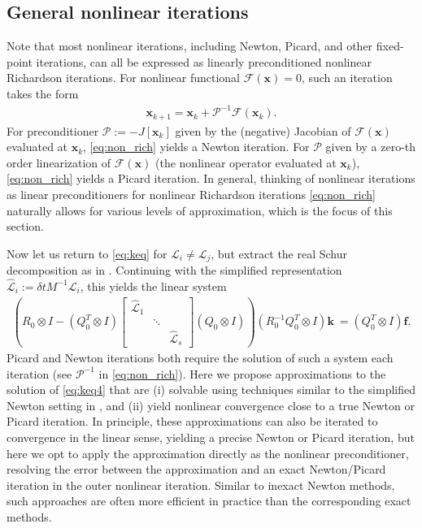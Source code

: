 \documentclass[review]{siamart}
\begin{document}
\subsection{General nonlinear iterations}\label{sec:nonlinear:gen}

Note that most nonlinear iterations, including Newton, Picard, and
other fixed-point iterations, can all be expressed as linearly preconditioned
nonlinear Richardson iterations. For nonlinear functional
$\mathcal{F}(\mathbf{x}) = 0$, such an iteration takes the form
%
\begin{align}\label{eq:non_rich}
\mathbf{x}_{k+1} = \mathbf{x}_k + \mathcal{P}^{-1}\mathcal{F}(\mathbf{x}_k).
\end{align}
%
For preconditioner $\mathcal{P} := -J[\mathbf{x}_k]$ given by the (negative)
Jacobian of $\mathcal{F}(\mathbf{x})$ evaluated at $\mathbf{x}_k$, \eqref{eq:non_rich}
yields a Newton iteration. For $\mathcal{P}$ given by a zero-th order linearization
of $\mathcal{F}(\mathbf{x})$ (the nonlinear operator evaluated at $\mathbf{x}_k$),
\eqref{eq:non_rich} yields a Picard iteration. In general, thinking of nonlinear
iterations as linear preconditioners for nonlinear Richardson iterations
\eqref{eq:non_rich} naturally allows for various levels of approximation,
which is the focus of this section.

Now let us return to \eqref{eq:keq} for $\mathcal{L}_i\neq\mathcal{L}_j$, but
extract the real Schur decomposition as in . Continuing
with the simplified representation $\widehat{\mathcal{L}}_i := \delta t M^{-1}\mathcal{L}_i$,
this yields the linear system
%
\begin{align}\label{eq:keq4}
\left( R_0\otimes I - (Q_0^T\otimes I) \begin{bmatrix}
	\widehat{\mathcal{L}}_1  & \\ & \ddots \\ && \widehat{\mathcal{L}}_s\end{bmatrix}
	(Q_0\otimes I)\right) (R_0^{-1}Q_0^T\otimes I) \mathbf{k}\
= (Q_0^T\otimes I)\mathbf{f}.
\end{align}
%
Picard and Newton iterations both require the solution of such a system each
iteration (see $\mathcal{P}^{-1}$ in \eqref{eq:non_rich}). Here we propose
approximations to the solution of \eqref{eq:keq4} that are (i) solvable using
techniques similar to the simplified Newton setting in
, and (ii) yield nonlinear convergence close to a true
Newton or Picard iteration. In principle, these approximations can also be
iterated to convergence in the linear sense, yielding a precise Newton or Picard
iteration, but here we opt to apply the approximation directly as the nonlinear
preconditioner, resolving the error between the approximation and an exact
Newton/Picard iteration in the outer nonlinear iteration. Similar to inexact
Newton methods, such approaches are often more efficient in practice than the
corresponding exact methods.
\end{document}
